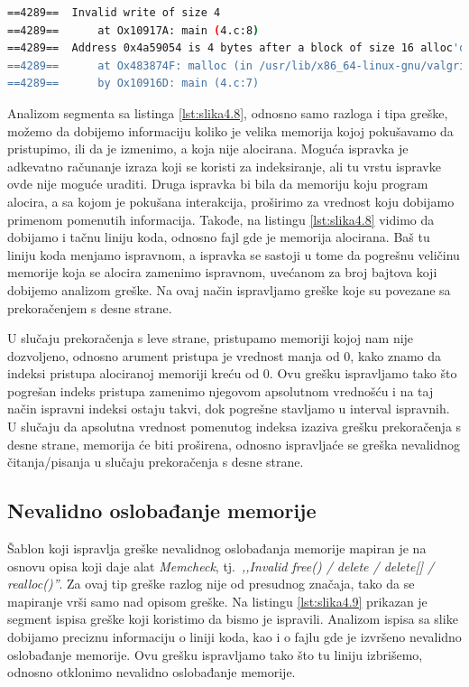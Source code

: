 \documentclass[12pt,oneside]{memoir}
\theoremstyle{plain}
\theoremstyle{definition}
\begin{document}

\begin{lstlisting}[style=terminal,caption={Ispis greške nevalidnog čitanja}, label={lst:slika4.8},language={bash}]   
==4289==  Invalid write of size 4
==4289==      at Ox10917A: main (4.c:8)
==4289==  Address 0x4a59054 is 4 bytes after a block of size 16 alloc'd
==4289==      at Ox483874F: malloc (in /usr/lib/x86_64-linux-gnu/valgrind/vgpreload_memcheck-amd64-linux.so) 
==4289==      by Ox10916D: main (4.c:7)
\end{lstlisting}

Analizom segmenta sa listinga \ref{lst:slika4.8}, odnosno samo razloga i tipa greške, možemo da dobijemo informaciju koliko je velika memorija kojoj pokušavamo da pristupimo, ili da je izmenimo, a koja nije alocirana. Moguća ispravka je adkevatno računanje izraza koji se koristi za indeksiranje, ali tu vrstu ispravke ovde nije moguće uraditi. Druga ispravka bi bila da memoriju koju program alocira, a sa kojom je pokušana interakcija, proširimo za vrednost koju dobijamo primenom pomenutih informacija. Takođe, na listingu \ref{lst:slika4.8} vidimo da dobijamo i tačnu liniju koda, odnosno fajl gde je memorija alocirana. Baš tu liniju koda menjamo ispravnom, a ispravka se sastoji u tome da pogrešnu veličinu memorije koja se alocira zamenimo ispravnom, uvećanom za broj bajtova koji dobijemo analizom greške. Na ovaj način ispravljamo greške koje su povezane sa prekoračenjem s desne strane. 

U slučaju prekoračenja s leve strane, pristupamo memoriji kojoj nam nije dozvoljeno, odnosno arument pristupa je vrednost manja od 0, kako znamo da indeksi pristupa alociranoj memoriji kreću od 0. Ovu grešku ispravljamo tako što pogrešan indeks pristupa zamenimo njegovom apsolutnom vrednošću i na taj način ispravni indeksi ostaju takvi, dok pogrešne stavljamo u interval ispravnih. U slučaju da apsolutna vrednost pomenutog indeksa izaziva grešku prekoračenja s desne strane, memorija će biti proširena, odnosno ispravljaće se greška nevalidnog čitanja/pisanja u slučaju prekoračenja s desne strane.  


\subsection{Nevalidno oslobađanje memorije}
Šablon koji ispravlja greške nevalidnog oslobađanja memorije mapiran je na osnovu opisa koji daje alat \textit{Memcheck}, tj.~\textit{,,Invalid free() / delete / delete[] / realloc()''}. Za ovaj tip greške razlog nije od presudnog značaja, tako da se mapiranje vrši samo nad opisom greške. Na listingu \ref{lst:slika4.9} prikazan je segment ispisa greške koji koristimo da bismo je ispravili. Analizom ispisa sa slike dobijamo preciznu informaciju o liniji koda, kao i o fajlu gde je izvršeno nevalidno oslobađanje memorije. Ovu grešku ispravljamo tako što tu liniju izbrišemo, odnosno otklonimo nevalidno oslobađanje memorije. 
\end{document}

